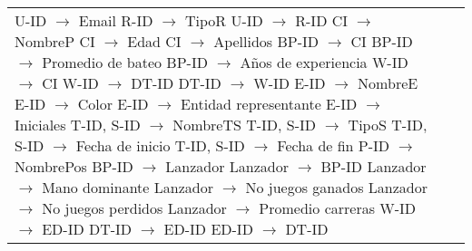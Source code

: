 \documentclass{report}
\begin{document}
\begin{tabularx}{\textwidth}{|X|X|X|}
        U-ID $\rightarrow$ Email \newline 
        R-ID $\rightarrow$ TipoR \newline 
        U-ID $\rightarrow$ R-ID \newline 
        CI $\rightarrow$ NombreP \newline 
        CI $\rightarrow$ Edad \newline 
        CI $\rightarrow$ Apellidos \newline 
        BP-ID $\rightarrow$ CI \newline 
        BP-ID $\rightarrow$ Promedio de bateo \newline 
        BP-ID $\rightarrow$ Años de experiencia \newline 
        W-ID $\rightarrow$ CI \newline 
        W-ID $\rightarrow$ DT-ID \newline 
        DT-ID $\rightarrow$ W-ID \newline 
        E-ID $\rightarrow$ NombreE \newline 
        E-ID $\rightarrow$ Color \newline 
        E-ID $\rightarrow$ Entidad representante \newline 
        E-ID $\rightarrow$ Iniciales \newline 
        T-ID, S-ID $\rightarrow$ NombreTS \newline 
        T-ID, S-ID $\rightarrow$ TipoS \newline 
        T-ID, S-ID $\rightarrow$ Fecha de inicio \newline 
        T-ID, S-ID $\rightarrow$ Fecha de fin \newline 
        P-ID $\rightarrow$ NombrePos \newline 
        BP-ID $\rightarrow$ Lanzador \newline 
        Lanzador $\rightarrow$ BP-ID \newline 
        Lanzador $\rightarrow$ Mano dominante \newline 
        Lanzador $\rightarrow$ No juegos ganados \newline 
        Lanzador $\rightarrow$ No juegos perdidos \newline 
        Lanzador $\rightarrow$ Promedio carreras \newline 
        W-ID $\rightarrow$ ED-ID \newline 
        DT-ID $\rightarrow$ ED-ID \newline 
        ED-ID $\rightarrow$ DT-ID \newline 

\end{tabularx}
\end{document}

